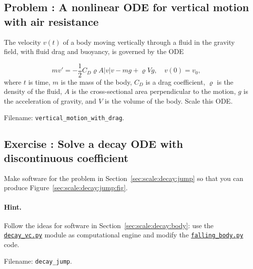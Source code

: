 \documentclass[graybox,envcountchap,sectrefs,final]{svmonodo}
\newcounter{doconce:movie:counter}
\newenvironment{doconceexercise}{}{}
\newcounter{doconceexercisecounter}
\begin{document}
\begin{doconceexercise}

\subsection*{Problem \thedoconceexercisecounter: A nonlinear ODE for vertical motion with air resistance}

\label{sec:scale:exer:ball_y_wdrag}

The velocity $v(t)$
of a body moving vertically through a fluid in the gravity field,
with fluid drag and buoyancy, is governed by the ODE

\[ mv' = -\frac{1}{2}C_D\varrho A |v|v - mg + \varrho V g,\quad v(0)=v_0,\]
where $t$ is time, $m$ is the mass of the body, $C_D$ is a drag coefficient,
$\varrho$ is the density of the fluid, $A$ is the cross-sectional area
perpendicular to the motion, $g$ is the acceleration of gravity,
and $V$ is the volume of the body. Scale this ODE.


\noindent Filename: \Verb!vertical_motion_with_drag!.

\end{doconceexercise}




\begin{doconceexercise}

\subsection*{Exercise \thedoconceexercisecounter: Solve a decay ODE with discontinuous coefficient}

\label{sec:scale:exer:decay:jump}

Make software for the problem in Section~\ref{sec:scale:decay:jump}
so that you can produce Figure~\ref{sec:scale:decay:jump:fig}.


\paragraph{Hint.}
Follow the ideas for software in Section~\ref{sec:scale:decay:body}: use the
\href{{http://tinyurl.com/o8pb3yy/decay_vc.py}}{\nolinkurl{decay_vc.py}} module as computational
engine and modify the
\href{{http://tinyurl.com/o8pb3yy/falling_body.py}}{\nolinkurl{falling_body.py}} code.



\noindent Filename: \Verb!decay_jump!.

\end{doconceexercise}
\end{document}
